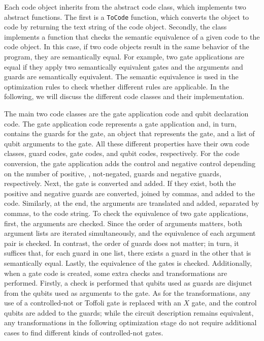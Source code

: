 Each code object inherits from the abstract code class, which implements two abstract functions. The first is a \texttt{ToCode} function, which converts the object to code by returning the text string of the code object. Secondly, the class implements a function that checks the semantic equivalence of a given code to the code object. In this case, if two code objects result in the same behavior of the program, they are semantically equal. For example, two gate applications are equal if they apply two semantically equivalent gates and the arguments and guards are semantically equivalent. The semantic equivalence is used in the optimization rules to check whether different rules are applicable. In the following, we will discuss the different code classes and their implementation. 

The main two code classes are the gate application code and qubit declaration code. The gate application code represents a gate application and, in turn, contains the guards for the gate, an object that represents the gate, and a list of qubit arguments to the gate. All these different properties have their own code classes, guard codes, gate codes, and qubit codes, respectively. For the code conversion, the gate application adds the control and negative control depending on the number of positive, \ie, not-negated, guards and negative guards, respectively. Next, the gate is converted and added. If they exist, both the positive and negative guards are converted, joined by commas, and added to the code. Similarly, at the end, the arguments are translated and added, separated by commas, to the code string. To check the equivalence of two gate applications, first, the arguments are checked. 
Since the order of arguments matters, both argument lists are iterated simultaneously, and the equivalence of each argument pair is checked. In contrast, the order of guards does not matter; in turn, it suffices that, for each guard in one list, there exists a guard in the other that is semantically equal. Lastly, the equivalence of the gates is checked. 
Additionally, when a gate code is created, some extra checks and transformations are performed. Firstly, a check is performed that qubits used as guards are disjunct from the qubits used as arguments to the gate. As for the transformations, any use of a controlled-not or Toffoli gate is replaced with an $X$ gate, and the control qubits are added to the guards; while the circuit description remains equivalent, any transformations in the following optimization stage do not require additional cases to find different kinds of controlled-not gates.

